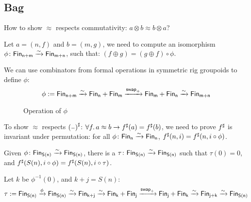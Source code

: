 \subsection{Bag}
How to show $\approx$ respects commutativity: $a \otimes b \approx b \otimes a$?

Let $a = (n , f)$ and $b = (m , g)$, we need to compute an isomorphism $\phi\colon \Fin[n+m]\xto{\sim}\Fin[m+n]$,
such that: $(f \oplus g) = (g \oplus f) \circ \phi$.

We can use combinators from formal operations in symmetric rig groupoids \cite{10.1145/3498667} to define $\phi$:
\begin{align*}
    \phi := \Fin[n+m] \xto{\sim} \Fin[n] + \Fin[m] \xto{\term{swap}_{+}} \Fin[m] + \Fin[n] \xto{\sim} \Fin[m+n] \\
\end{align*}

\begin{figure}[H]
    \centering
    \vspace{-1em}
    \caption{Operation of $\phi$}
    \label{fig:enter-label}
\end{figure}

To show $\approx$ respects ${({\scriptstyle{-}})}^{\sharp}$: $\forall f. \, a \approx b \to {f}^{\sharp}(a) = {f}^{\sharp}(b)$,
we need to prove ${f}^{\sharp}$ is invariant under permutation: for all $\phi\colon \Fin[n]\xto{\sim}\Fin[n]$,
$\ext{f}(n, i) \id \ext{f}(n, i \circ \phi)$.

\begin{lemma}
Given $\phi\colon \Fin[S(n)]\xto{\sim}\Fin[S(n)]$, there is a $\tau\colon \Fin[S(n)]\xto{\sim}\Fin[S(n)]$
such that $\tau(0) = 0$, and ${f}^{\sharp}(S(n), i \circ \phi) = {f}^{\sharp}(S(n), i \circ \tau)$.
\end{lemma}

Let $k$ be $\phi^{-1}(0)$, and $k + j = S(n)$:
\begin{align*}
    \tau := \Fin[S(n)] \xto{\phi} \Fin[S(n)] \xto{\sim} \Fin[k+j] \xto{\sim} \Fin[k] + \Fin[j]
    \xto{\term{swap}_{+}} \Fin[j] + \Fin[k] \xto{\sim} \Fin[j+k] \xto{\sim} \Fin[S(n)]
\end{align*}

